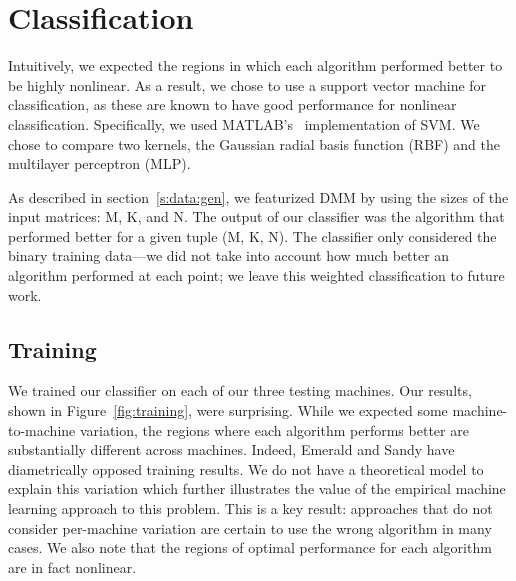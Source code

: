 \section{Classification}
\label{s:class}
Intuitively, we expected the regions in which each algorithm performed better to be highly nonlinear.
As a result, we chose to use a support vector machine for classification, as these are known to have good performance for nonlinear classification.
Specifically, we used MATLAB's~ implementation of SVM.
We chose to compare two kernels, the Gaussian radial basis function (RBF) and the multilayer perceptron (MLP).

As described in section~\ref{s:data:gen}, we featurized DMM by using the sizes of the input matrices: M, K, and N.
The output of our classifier was the algorithm that performed better for a given tuple (M, K, N).
The classifier only considered the binary training data---we did not take into account how much better an algorithm performed at each point; we leave this weighted classification to future work.

\subsection{Training}
We trained our classifier on each of our three testing machines.
Our results, shown in Figure~\ref{fig:training}, were surprising.
While we expected some machine-to-machine variation, the regions where each algorithm performs better are substantially different across machines.
Indeed, Emerald and Sandy have diametrically opposed training results.
We do not have a theoretical model to explain this variation which further illustrates the value of the empirical machine learning approach to this problem.
This is a key result: approaches that do not consider per-machine variation are certain to use the wrong algorithm in many cases.
We also note that the regions of optimal performance for each algorithm are in fact nonlinear.


